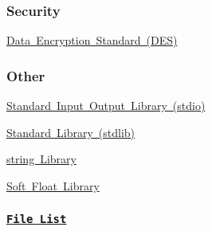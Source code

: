 \subsubsection*{Security}


\begin{DoxyItemize}
\item \mbox{\hyperlink{a00140}{Data Encryption Standard (D\+ES)}}
\end{DoxyItemize}

\subsubsection*{Other}


\begin{DoxyItemize}
\item \mbox{\hyperlink{a00150}{Standard Input Output Library (stdio)}}
\item \mbox{\hyperlink{a00151}{Standard Library (stdlib)}}
\item \mbox{\hyperlink{a00152}{string Library}}
\item \mbox{\hyperlink{a00148}{Soft Float Library}}
\end{DoxyItemize}

\subsubsection*{\href{files.html}{\tt File List}}